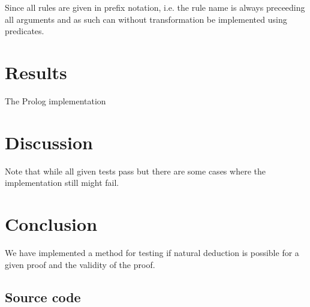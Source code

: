 \documentclass[a4paper,11pt]{article}
\begin{document}
Since all rules are given in prefix notation, i.e. the rule name is always preceeding all arguments and as such can without transformation be implemented using predicates. 
\section{Results}
The Prolog implementation 
\section{Discussion}
Note that while all given tests pass but there are some cases where the implementation still might fail. 
\section{Conclusion}
We have implemented a method for testing if natural deduction is possible for a given proof and the validity of the proof.
\newpage
\begin{appendices}
\section{Source code}

\end{appendices}
\end{document}
